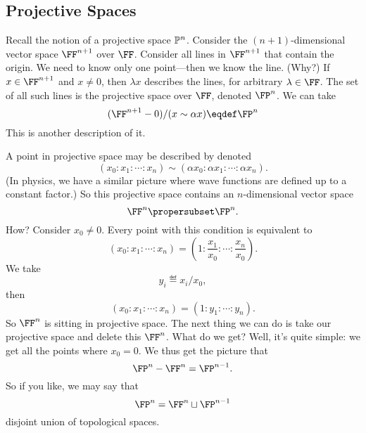 
\subsection{Projective Spaces}
Recall the notion of a projective space $\mathbb{P}^n$. Consider the
$(n+1)$-dimensional vector space $\FF^{n+1}$ over $\FF$. Consider
all lines in $\FF^{n+1}$ that contain the origin. We need to know
only one point---then we know the line. (Why?) If $x\in\FF^{n+1}$
and $x\not=0$, then $\lambda x$ describes the lines, for
arbitrary $\lambda\in\FF$. The set of all such lines is the
projective space over $\FF$, denoted $\FP^{n}$. We can take
\begin{equation}
(\FF^{n+1}-0)/(x\sim \alpha x)\eqdef\FP^{n}
\end{equation}
This is another description of it.

A point in projective space may be described
by 
denoted
\begin{equation}
(x_0:x_1:\cdots:x_n)\sim(\alpha x_0:\alpha x_1:\cdots:\alpha x_n).
\end{equation}
(In physics, we have a similar picture where wave functions are
defined up to a constant factor.) So this projective space
contains an $n$-dimensional vector space
\begin{equation}
\FF^n\propersubset\FP^n.
\end{equation}
How? Consider $x_0\not=0$. Every point with this condition is
equivalent to
\begin{equation}
(x_0:x_1:\cdots:x_n) = \left(1:\frac{x_1}{x_0}:\cdots:\frac{x_n}{x_0}\right).
\end{equation}
We take
\begin{equation}
y_i\eqdef x_i/x_0,
\end{equation}
then
\begin{equation}
(x_0:x_1:\cdots:x_n) = \left(1:y_1:\cdots:y_n\right).
\end{equation}So $\FF^n$ is sitting in projective space. The next
thing we can do is take our projective space and delete this
$\FF^n$. What do we get? Well, it's quite simple: we get all the
points where $x_0=0$. We thus get the picture that
\begin{equation}
\FP^n-\FF^n=\FP^{n-1}.
\end{equation}
So if you like, we may say that
\begin{equation}
\FP^{n}=\FF^n\sqcup\FP^{n-1}
\end{equation}
disjoint union of topological spaces.

